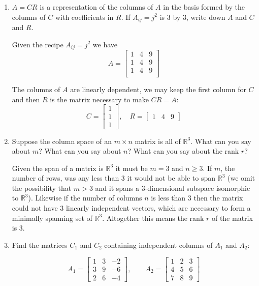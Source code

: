 \documentclass{scrartcl}
\newcommand{\R}{\mathbb{R}}
\begin{document}
\begin{enumerate}
\item $A = CR$ is a representation of the columns of $A$ in the basis formed by the columns of $C$ with coefficients in $R$. If $A_{ij} = j^2$ is 3 by 3, write down $A$ and $C$ and $R$. 

Given the recipe $A_{ij} = j^2$ we have
$$A = \begin{bmatrix}
	1 & 4 & 9 \\	1 & 4 & 9 \\	1 & 4 & 9 \\
\end{bmatrix}$$

The columns of $A$ are linearly dependent, we may keep the first column for $C$ and then $R$ is the matrix necessary to make $CR = A$:
$$C = \begin{bmatrix}
	1 \\ 1 \\ 1
\end{bmatrix}, \quad R = \begin{bmatrix}
	1 & 4 & 9
\end{bmatrix}$$

\item Suppose the column space of an $m \times n$ matrix is all of $\R^3$. What can you say about $m$? What can you say about $n$? What can you say about the rank $r$?

Given the span of a matrix is $\R^3$ it must be $m = 3$ and $n \geq 3$. If $m$, the number of rows, was any less than 3 it would not be able to span $\R^3$ (we omit the possibility that $m > 3$ and it spans a 3-dimensional subspace isomorphic to $\R^3$). Likewise if the number of columns $n$ is less than 3 then the matrix could not have 3 linearly independent vectors, which are necessary to form a minimally spanning set of $\R^3$. Altogether this means the rank $r$ of the matrix is 3.

\item Find the matrices $C_1$ and $C_2$ containing independent columns of $A_1$ and $A_2$:

$$A_1 = \begin{bmatrix}
	1 & 3 & -2\\3 & 9 & -6\\2 & 6 & -4
\end{bmatrix}, \qquad A_2 = \begin{bmatrix}
	1 & 2 & 3 \\ 4 & 5 & 6 \\ 7 & 8 & 9
\end{bmatrix}$$


\end{enumerate}
\end{document}
